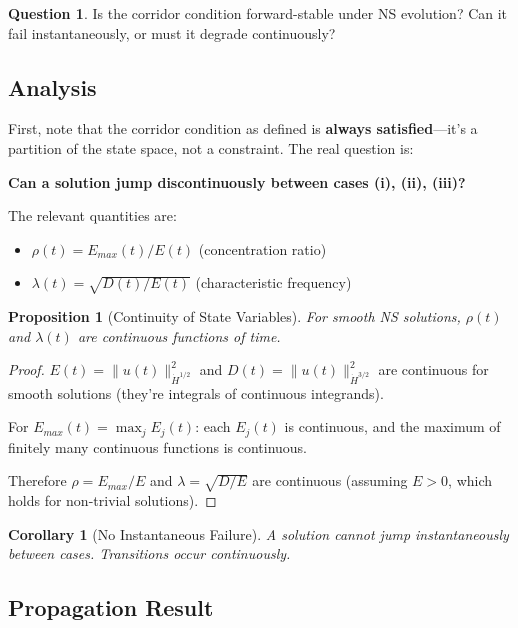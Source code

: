 \documentclass[11pt]{article}
\newtheorem{proposition}[theorem]{Proposition}
\newtheorem{corollary}[theorem]{Corollary}
\theoremstyle{definition}
\newtheorem{question}{Question}
\begin{document}
\begin{question}
Is the corridor condition forward-stable under NS evolution? Can it fail instantaneously, or must it degrade continuously?
\end{question}

\subsection{Analysis}

First, note that the corridor condition as defined is \textbf{always satisfied}---it's a partition of the state space, not a constraint. The real question is:

\textbf{Can a solution jump discontinuously between cases (i), (ii), (iii)?}

The relevant quantities are:
\begin{itemize}
\item $\rho(t) = E_{max}(t)/E(t)$ (concentration ratio)
\item $\lambda(t) = \sqrt{D(t)/E(t)}$ (characteristic frequency)
\end{itemize}

\begin{proposition}[Continuity of State Variables]
For smooth NS solutions, $\rho(t)$ and $\lambda(t)$ are continuous functions of time.
\end{proposition}

\begin{proof}
$E(t) = \|u(t)\|_{\dot{H}^{1/2}}^2$ and $D(t) = \|u(t)\|_{\dot{H}^{3/2}}^2$ are continuous for smooth solutions (they're integrals of continuous integrands).

For $E_{max}(t) = \max_j E_j(t)$: each $E_j(t)$ is continuous, and the maximum of finitely many continuous functions is continuous.

Therefore $\rho = E_{max}/E$ and $\lambda = \sqrt{D/E}$ are continuous (assuming $E > 0$, which holds for non-trivial solutions).
\end{proof}

\begin{corollary}[No Instantaneous Failure]
A solution cannot jump instantaneously between cases. Transitions occur continuously.
\end{corollary}

\subsection{Propagation Result}
\end{document}
